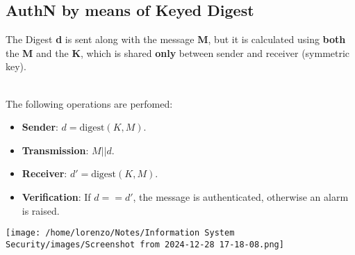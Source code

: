 \subsection{AuthN by means of Keyed Digest}
The Digest \textbf{d} is sent along with the message \textbf{M}, but it is calculated using \textbf{both} the \textbf{M} and the
\textbf{K}, which is shared \textbf{only} between sender and receiver (symmetric key).
\\
\\
\begin{minipage}{0.5\textwidth}
\vspace{-1cm}
The following operations are perfomed:
\begin{itemize}
    \item \textbf{Sender}: \(d = \text{digest}(K, M)\).
    \item \textbf{Transmission}: \(M || d\).
    \item \textbf{Receiver}: \(d' = \text{digest}(K, M)\).
    \item \textbf{Verification}: If \(d == d'\), the message is authenticated, otherwise an alarm is raised.
\end{itemize}

\end{minipage} 
\hspace{0.3cm}
\begin{minipage}{0.5\textwidth}
    \centering
    \texttt{[image: /home/lorenzo/Notes/Information System Security/images/Screenshot from 2024-12-28 17-18-08.png]}
\end{minipage}

